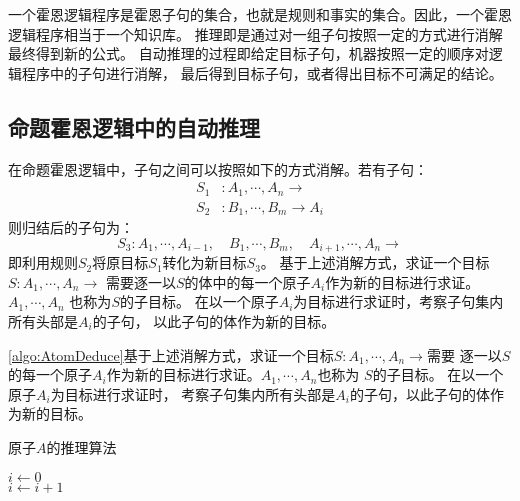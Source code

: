 一个霍恩逻辑程序是霍恩子句的集合，也就是规则和事实的集合。因此，一个霍恩逻辑程序相当于一个知识库。
推理即是通过对一组子句按照一定的方式进行消解最终得到新的公式。
自动推理的过程即给定目标子句，机器按照一定的顺序对逻辑程序中的子句进行消解，
最后得到目标子句，或者得出目标不可满足的结论。

\subsection{命题霍恩逻辑中的自动推理}
在命题霍恩逻辑中，子句之间可以按照如下的方式消解。若有子句：
\begin{align*}
        S_1 &: A_1, \cdots , A_n \rightarrow \\
        S_2 &: B_1, \cdots, B_m \rightarrow A_i
\end{align*}
则归结后的子句为：
\begin{equation*}
        S_3: A_1, \cdots , A_{i-1}, \quad B_1, \cdots , B_m, 
        \quad A_{i+1}, \cdots , A_n \rightarrow
\end{equation*}
即利用规则$S_2$将原目标$S_1$转化为新目标$S_3$。
基于上述消解方式，求证一个目标 $ S: A_1, \cdots , A_n \rightarrow $
需要逐一以$S$的体中的每一个原子$A_i$作为新的目标进行求证。$A_1, \cdots , A_n$
也称为$S$的子目标。
在以一个原子$A_i$为目标进行求证时，考察子句集内所有头部是$A_i$的子句，
以此子句的体作为新的目标。 

\cref{algo:AtomDeduce}基于上述消解方式，求证一个目标$S: A_1, \cdots, A_n \rightarrow $需要
逐一以$S$的每一个原子$A_i$作为新的目标进行求证。$A_1,\cdots,A_n$也称为
$S$的子目标。
在以一个原子$A_i$为目标进行求证时，
考察子句集内所有头部是$A_i$的子句，以此子句的体作为新的目标。
\begin{algorithm}
        \caption{原子$A$的推理算法}
        \label{algo:AtomDeduce}
        \begin{algorithmic}[1]
                        \State $i \gets 0$
                         
                         
                        \State{} 
                                                \State{}
                                        \\
                                        \State{} 
                                        \EndIf
                                        \State $i \gets i + 1$ \\
                                \EndIf
                        \EndWhile
                        \State{} 
                \EndFunction
        \end{algorithmic}
\end{algorithm}

